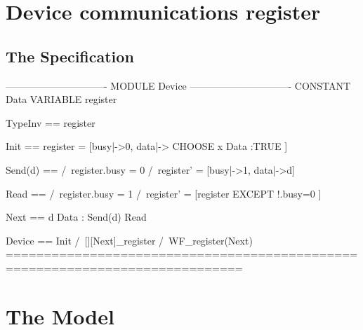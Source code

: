 \documentclass[12pt]{article}
\begin{document}
\section{Device communications register}
\subsection{The Specification} 
\begin{tla}
------------------------------- MODULE Device -------------------------------
CONSTANT Data
VARIABLE register

TypeInv == 
    register 

Init == 
    register = [busy|->0, data|-> CHOOSE x \in Data :TRUE ]

Send(d) ==
    /\ register.busy = 0
    /\ register' = [busy|->1, data|->d]

Read == 
    /\ register.busy = 1
    /\ register' = [register EXCEPT !.busy=0 ]

Next == 
    \/ \E d \in Data : Send(d)
    \/ Read 

Device == Init /\ [][Next]_register /\ WF_register(Next)
=============================================================================
\end{tla}
\begin{tlatex}
\@x{}\moduleLeftDash{}\moduleRightDash\@xx{}%
%
%
\@pvspace{8.0pt}%
%
\@pvspace{8.0pt}%
%
\@pvspace{8.0pt}%
%
%
\@pvspace{8.0pt}%
%
%
\@pvspace{8.0pt}%
%
%
%
\@pvspace{8.0pt}%
\@x{}\bottombar\@xx{}%
\end{tlatex}

\section{The Model}
\end{document}
